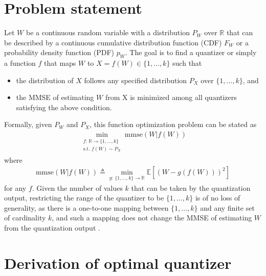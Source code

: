 \documentclass[conference]{IEEEtran}
\newcommand{\R}{\mathbb{R}}
\newcommand{\E}{\mathbb{E}}
\def\deq{\triangleq}
\begin{document}
\section{Problem statement}
Let $W$ be a continuous random variable with a distribution $P_W$ over $\R$ that can be described by a continuous cumulative distribution function (CDF) $F_W$ or a probability density function (PDF) $p_W$.
The goal is to find a quantizer or simply a function $f$ that maps $W$ to $X=f(W)\in\{1,\ldots,k\}$ such that 
\begin{itemize}[leftmargin=*]
    \item the distribution of $X$ follows any specified distribution $P_X$ over $\{1,\ldots,k\}$, and
    \item the MMSE of estimating $W$ from X is minimized among all quantizers satisfying the above condition.
\end{itemize}
Formally, given $P_W$ and $P_X$, this function optimization problem can be stated as
\begin{align}
    \min_{\substack{f:\,\R \rightarrow \{1,\ldots,k\} \\ \text{s.t. } f(W)\sim P_X}} \text{mmse}(W|f(W)) \label{eq:opt1}
\end{align}
where 
\begin{align}
\text{mmse}(W|f(W)) \deq \min_{g:\,\{1,\ldots,k\}\rightarrow\R}\E[(W-g(f(W)))^2]    
\end{align}
for any $f$.
Given the number of values $k$ that can be taken by the quantization output, restricting the range of the quantizer to be 
$\{1,\ldots,k\}$ is of no loss of generality, as there is a one-to-one mapping between $\{1,\ldots,k\}$ and any finite set of cardinality $k$, and such a mapping does not change the MMSE of estimating $W$ from the quantization output \cite[Lemma~1]{MER2022}.


\section{Derivation of optimal quantizer}
\end{document}
